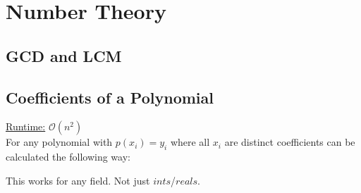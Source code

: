 \section{Number Theory}
\subsection{GCD and LCM}


\subsection{Coefficients of a Polynomial}
\underline{Runtime:} $\mathcal{O}(n^2)$ \\
For any polynomial with $p(x_i) = y_i$ where all $x_i$ are distinct
coefficients can be calculated the following way:

This works for any field. Not just $ints$/$reals$.